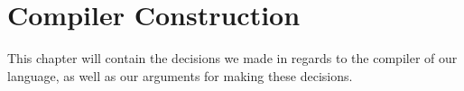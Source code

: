 \chapter{Compiler Construction}
This chapter will contain the decisions we made in regards to the compiler of our language, as well as our arguments for making these decisions.
